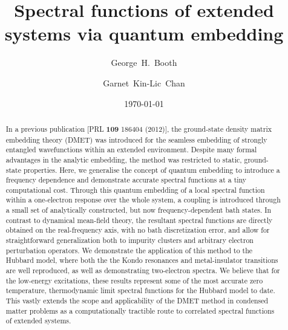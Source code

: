\documentclass[aps,showpacs,twocolumn,nobibnotes]{revtex4}
\begin{document}
\title{Spectral functions of extended systems via quantum embedding}
\author{George~H.~Booth}
\author{Garnet~Kin-Lic~Chan}  

\begin{abstract}
In a previous publication [PRL {\bf 109} 186404 (2012)], the ground-state density matrix embedding theory (DMET) was introduced for the seamless embedding of
strongly entangled wavefunctions within an extended environment. 
Despite many formal advantages in the analytic embedding, the method was restricted to static, ground-state properties.
Here, we generalise the concept of quantum embedding to introduce a frequency dependence and demonstrate accurate spectral functions at a tiny
computational cost. Through this quantum embedding of a local spectral function within a one-electron response over the whole system, 
a coupling is introduced through a small set of 
analytically constructed, but now frequency-dependent bath states. In contrast to dynamical mean-field theory, the resultant 
spectral functions are directly obtained on the real-frequency axis, with no bath discretization error, and allow for straightforward generalization both 
to impurity clusters and arbitrary electron perturbation operators. We demonstrate
the application of this method to the Hubbard model, where both the the Kondo resonances and metal-insulator transitions are well reproduced, as well as 
demonstrating two-electron spectra. We believe that for the low-energy excitations, these results represent some of the most accurate 
zero temperature, thermodynamic limit spectral functions for the Hubbard model to date. This vastly extends the scope and applicability 
of the DMET method in condensed matter problems as a computationally tractible route to correlated spectral functions of extended systems.
\end{abstract}
\date{\today}
\maketitle
\end{document}

